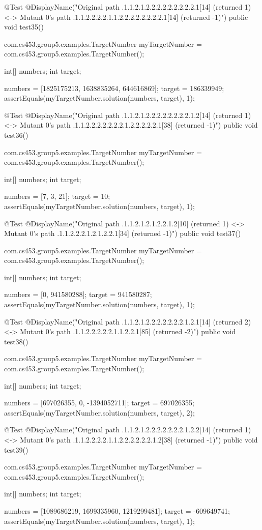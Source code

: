 @Test
@DisplayName("Original path .1.1.2.1.2.2.2.2.2.2.2.2.2.1[14] (returned 1) <-> Mutant 0's path .1.1.2.2.2.2.1.1.2.2.2.2.2.2.2.2.1[14] (returned -1)")
public void test35() {
    com.cs453.group5.examples.TargetNumber myTargetNumber = com.cs453.group5.examples.TargetNumber();

    int[] numbers;
    int target;

    numbers = [1825175213, 1638835264, 644616869];
    target = 186339949;
    assertEquals(myTargetNumber.solution(numbers, target), 1);
}

@Test
@DisplayName("Original path .1.1.2.1.2.2.2.2.2.2.2.2.1.2[14] (returned 1) <-> Mutant 0's path .1.1.2.2.2.2.2.2.2.1.2.2.2.2.2.1[38] (returned -1)")
public void test36() {
    com.cs453.group5.examples.TargetNumber myTargetNumber = com.cs453.group5.examples.TargetNumber();

    int[] numbers;
    int target;

    numbers = [7, 3, 21];
    target = 10;
    assertEquals(myTargetNumber.solution(numbers, target), 1);
}

@Test
@DisplayName("Original path .1.1.2.1.2.1.2.2.1.2[10] (returned 1) <-> Mutant 0's path .1.1.2.2.2.1.2.1.2.2.1[34] (returned -1)")
public void test37() {
    com.cs453.group5.examples.TargetNumber myTargetNumber = com.cs453.group5.examples.TargetNumber();

    int[] numbers;
    int target;

    numbers = [0, 941580288];
    target = 941580287;
    assertEquals(myTargetNumber.solution(numbers, target), 1);
}

@Test
@DisplayName("Original path .1.1.2.1.2.2.2.2.2.2.2.1.2.1[14] (returned 2) <-> Mutant 0's path .1.1.2.2.2.2.2.1.1.2.2.1[85] (returned -2)")
public void test38() {
    com.cs453.group5.examples.TargetNumber myTargetNumber = com.cs453.group5.examples.TargetNumber();

    int[] numbers;
    int target;

    numbers = [697026355, 0, -1394052711];
    target = 697026355;
    assertEquals(myTargetNumber.solution(numbers, target), 2);
}

@Test
@DisplayName("Original path .1.1.2.1.2.2.2.2.2.2.2.1.2.2[14] (returned 1) <-> Mutant 0's path .1.1.2.2.2.2.1.1.2.2.2.2.2.2.1.2[38] (returned -1)")
public void test39() {
    com.cs453.group5.examples.TargetNumber myTargetNumber = com.cs453.group5.examples.TargetNumber();

    int[] numbers;
    int target;

    numbers = [1089686219, 1699335960, 1219299481];
    target = -609649741;
    assertEquals(myTargetNumber.solution(numbers, target), 1);
}

